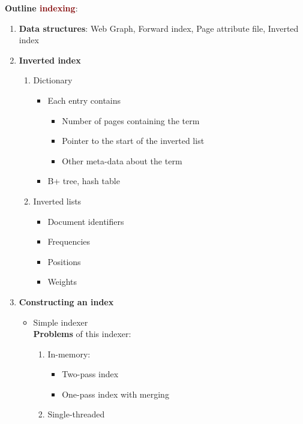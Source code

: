\newpage
\textbf{Outline \textcolor{Maroon}{indexing}}:
\begin{enumerate}
    \setlength\itemsep{0em}
    \item \textbf{Data structures}: Web Graph, Forward index, Page attribute file, Inverted index
    \item \textbf{Inverted index}
    \begin{enumerate}
        \item Dictionary
        \begin{itemize}
            \item Each entry contains
            \begin{itemize}
                \item Number of pages containing the term
                \item Pointer to the start of the inverted list
                \item Other meta-data about the term
            \end{itemize}
            \item B+ tree, hash table
        \end{itemize}
        \item Inverted lists
        \begin{itemize}
            \item Document identifiers
            \item Frequencies
            \item Positions
            \item Weights
        \end{itemize}
    \end{enumerate}
    \item \textbf{Constructing an index}
    \begin{itemize}
        \item Simple indexer \\
        \textbf{Problems} of this indexer:
        \begin{enumerate}
            \item In-memory:
            \begin{itemize}
                \item Two-pass index
                \item One-pass index with merging
            \end{itemize}
            \item Single-threaded
            \begin{itemize}

\end{itemize}
\end{enumerate}
\end{itemize}
\end{enumerate}
